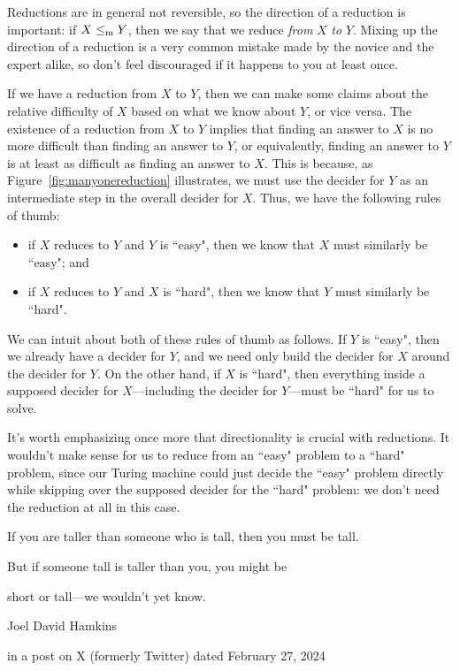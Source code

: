 \begin{dangerous}
Reductions are in general not reversible, so the direction of a reduction is important: if $X \leq_{\mathrm{m}} Y$, then we say that we reduce \emph{from} $X$ \emph{to} $Y$. Mixing up the direction of a reduction is a very common mistake made by the novice and the expert alike, so don't feel discouraged if it happens to you at least once.
\end{dangerous}

If we have a reduction from $X$ to $Y$, then we can make some claims about the relative difficulty of $X$ based on what we know about $Y$, or vice versa. The existence of a reduction from $X$ to $Y$ implies that finding an answer to $X$ is no more difficult than finding an answer to $Y$, or equivalently, finding an answer to $Y$ is at least as difficult as finding an answer to $X$. This is because, as Figure~\ref{fig:manyonereduction} illustrates, we must use the decider for $Y$ as an intermediate step in the overall decider for $X$. Thus, we have the following rules of thumb:
\begin{colouredbox}
\begin{itemize}
\item if $X$ reduces to $Y$ and $Y$ is ``easy", then we know that $X$ must similarly be ``easy"; and
\item if $X$ reduces to $Y$ and $X$ is ``hard", then we know that $Y$ must similarly be ``hard".
\end{itemize}
\end{colouredbox}
We can intuit about both of these rules of thumb as follows. If $Y$ is ``easy", then we already have a decider for $Y$, and we need only build the decider for $X$ around the decider for $Y$. On the other hand, if $X$ is ``hard", then everything inside a supposed decider for $X$---including the decider for $Y$---must be ``hard" for us to solve.

It's worth emphasizing once more that directionality is crucial with reductions. It wouldn't make sense for us to reduce from an ``easy" problem to a ``hard" problem, since our Turing machine could just decide the ``easy" problem directly while skipping over the supposed decider for the ``hard" problem: we don't need the reduction at all in this case.\par
\epigraph{If you are taller than someone who is tall, then you must be tall.\par
But if someone tall is taller than you, you might be\par
short or tall---we wouldn't yet know.}{Joel David Hamkins}{in a post on X (formerly Twitter) dated February 27, 2024}{}
\vspace{1em}

